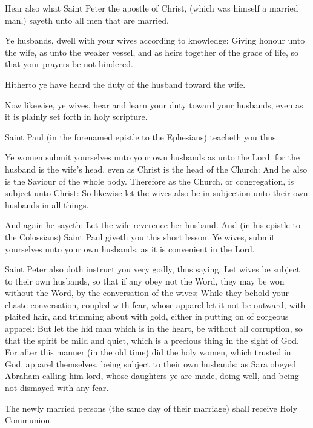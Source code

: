     Hear also what Saint Peter the apostle of Christ, (which was himself a married man,) sayeth unto all men that are married.\par
    Ye husbands, dwell with your wives according to knowledge: Giving honour unto the wife, as unto the weaker vessel, and as heirs together of the grace of life, so that your prayers be not hindered.\par
    Hitherto ye have heard the duty of the husband toward the wife.\par
    Now likewise, ye wives, hear and learn your duty toward your husbands, even as it is plainly set forth in holy scripture.\par
    Saint Paul (in the forenamed epistle to the Ephesians) teacheth you thus:\par
    Ye women submit yourselves unto your own husbands as unto the Lord: for the husband is the wife's head, even as Christ is the head of the Church: And he also is the Saviour of the whole body. Therefore as the Church, or congregation, is subject unto Christ: So likewise let the wives also be in subjection unto their own husbands in all things.\par
    And again he sayeth: Let the wife reverence her husband. And (in his epistle to the Colossians) Saint Paul giveth you this short lesson. Ye wives, submit yourselves unto your own husbands, as it is convenient in the Lord.\par
    Saint Peter also doth instruct you very godly, thus saying, Let wives be subject to their own husbands, so that if any obey not the Word, they may be won without the Word, by the conversation of the wives; While they behold your chaste conversation, coupled with fear, whose apparel let it not be outward, with plaited hair, and trimming about with gold, either in putting on of gorgeous apparel: But let the hid man which is in the heart, be without all corruption, so that the spirit be mild and quiet, which is a precious thing in the sight of God. For after this manner (in the old time) did the holy women, which trusted in God, apparel themselves, being subject to their own husbands: as Sara obeyed Abraham calling him lord, whose daughters ye are made, doing well, and being not dismayed with any fear.
\begin{rubric}
	The newly married persons (the same day of their marriage) shall receive Holy Communion. 
\end{rubric}